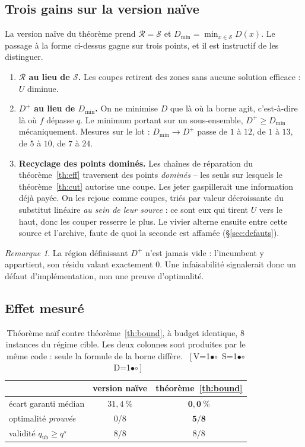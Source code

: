 \documentclass[11pt,a4paper]{article}
\theoremstyle{plain}
\theoremstyle{remark}
\newtheorem{remark}{Remarque}
\newcommand{\Scal}{\mathcal{S}}
\newcommand{\Rcal}{\mathcal{R}}
\newcommand{\qs}{q^{\star}}
\newcommand{\cfgm}[1]{\ifnum#1=1$\bullet$\else$\circ$\fi}
\newcommand{\conf}[3]{%
  \textsf{\footnotesize[\,V\cfgm{#1}\ S\cfgm{#2}\ D\cfgm{#3}\,]}}
\begin{document}
\subsection{Trois gains sur la version naïve}

La version naïve du théorème prend $\Rcal=\Scal$ et
$D_{\min}=\min_{x\in\Scal}D(x)$. Le passage à la forme ci-dessus gagne sur
trois points, et il est instructif de les distinguer.

\begin{enumerate}[leftmargin=*,itemsep=3pt]
\item \textbf{$\Rcal$ au lieu de $\Scal$.} Les coupes retirent des zones sans
      aucune solution efficace : $U$ diminue.
\item \textbf{$D^{+}$ au lieu de $D_{\min}$.} On ne minimise $D$ que là où la
      borne agit, c'est-à-dire là où $f$ dépasse $q$. Le minimum portant sur
      un sous-ensemble, $D^{+}\ge D_{\min}$ mécaniquement. Mesures sur le lot :
      $D_{\min}\to D^{+}$ passe de $1$ à $12$, de $1$ à $13$, de $5$ à $10$,
      de $7$ à $24$.
\item \textbf{Recyclage des points dominés.} Les chaînes de réparation du
      théorème~\ref{th:eff} traversent des points \emph{dominés} -- les seuls
      sur lesquels le théorème~\ref{th:cut} autorise une coupe. Les jeter
      gaspillerait une information déjà payée. On les rejoue comme coupes,
      triés par valeur décroissante du substitut linéaire \emph{au sein de
      leur source} : ce sont eux qui tirent $U$ vers le haut, donc les
      couper resserre le plus. Le vivier alterne ensuite entre cette source
      et l'archive, faute de quoi la seconde est affamée
      (§\ref{sec:defauts}).
\end{enumerate}

\begin{remark}
La région définissant $D^{+}$ n'est jamais vide : l'incumbent y appartient,
son résidu valant exactement $0$. Une infaisabilité signalerait donc un
défaut d'implémentation, non une preuve d'optimalité.
\end{remark}

\subsection{Effet mesuré}

\begin{table}[H]
\centering
\caption{Théorème naïf contre théorème~\ref{th:bound}, à budget identique,
8 instances du régime cible. Les deux colonnes sont produites par le même
code : seule la formule de la borne diffère.\ \conf{0}{0}{0}}
\label{tab:bound}
\begin{tabular}{lcc}
\toprule
& version naïve & théorème~\ref{th:bound}\\
\midrule
écart garanti médian & $31{,}4\ \%$ & $\mathbf{0{,}0\ \%}$\\
optimalité \emph{prouvée} & 0/8 & $\mathbf{5/8}$\\
validité $q_{\text{ub}}\ge\qs$ & 8/8 & 8/8\\
\bottomrule
\end{tabular}
\end{table}
\end{document}
